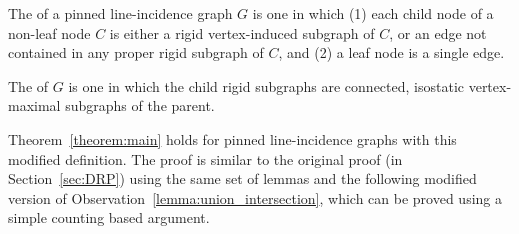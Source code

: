 \begin{definition}
    The  of a  pinned line-incidence graph $G$ is one in which (1) each child node of a non-leaf node $C$ is either a  rigid vertex-induced subgraph of $C$, or an edge not contained in any  proper rigid subgraph of $C$, and (2) a leaf node is a single edge.

    The   of $G$  is one in which the  child rigid subgraphs are connected, isostatic vertex-maximal subgraphs of the parent.
\end{definition}


Theorem~\ref{theorem:main} holds for pinned line-incidence graphs with this modified definition. The proof is similar to the original proof (in Section~\ref{sec:DRP}) using the same set of lemmas and
%
%
the following modified version of Observation~\ref{lemma:union_intersection},
which  can be proved using a simple counting based argument.


